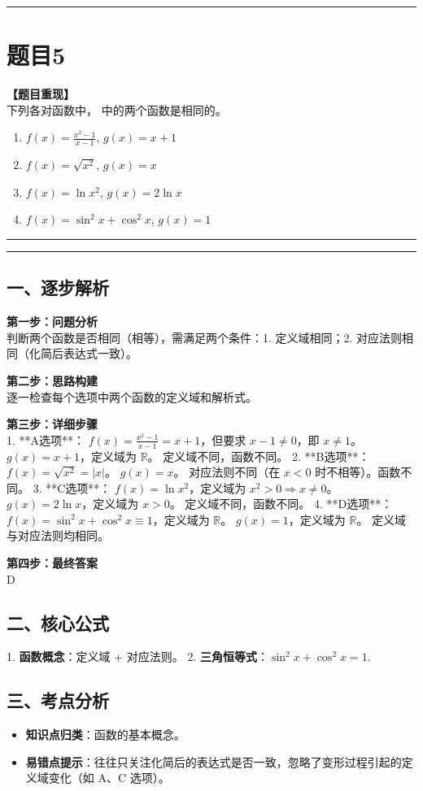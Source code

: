 \documentclass[12pt, a4paper]{ctexart}
\newcommand{\TopSeparator}{
    \par\noindent\rule{\textwidth}{1.5pt}\vspace{0.5em} %
}
\newcommand{\AnalysisSeparator}{
    \par\noindent\rule{\textwidth}{0.5pt}\vspace{0.2em}\hrule\vspace{0.5em} %
}
\newenvironment{RedAnalysis}{
    \par
    \color{red} %
}{
    \par
    \color{black} %
}
\newcommand{\choices}[4]{
    \begin{enumerate}[label=\Alph*., itemsep=0pt, parsep=0pt, topsep=5pt, labelsep=0.5em]
        \item #1
        \item #2
        \item #3
        \item #4
    \end{enumerate}
}
\begin{document}
\vspace{2em}

\TopSeparator
\section*{题目5}

\textbf{【题目重现】} \\
下列各对函数中，\underline{\hspace{1cm}} 中的两个函数是相同的。
\choices
    {$ f(x)=\frac{x^{2}-1}{x-1} $, $ g(x)=x+1 $}
    {$ f(x)=\sqrt{x^{2}} $, $ g(x)=x $}
    {$ f(x) = \ln x^{2} $, $ g(x) = 2\ln x $}
    {$ f(x) = \sin^{2}x + \cos^{2}x $, $ g(x) = 1 $}

\AnalysisSeparator

\begin{RedAnalysis}

\subsection*{一、逐步解析}

\textbf{第一步：问题分析} \\
判断两个函数是否相同（相等），需满足两个条件：1. 定义域相同；2. 对应法则相同（化简后表达式一致）。

\textbf{第二步：思路构建} \\
逐一检查每个选项中两个函数的定义域和解析式。

\textbf{第三步：详细步骤} \\
1. **A选项**：
   $f(x) = \frac{x^2-1}{x-1} = x+1$，但要求 $x-1 \ne 0$，即 $x \ne 1$。
   $g(x) = x+1$，定义域为 $\mathbb{R}$。
   定义域不同，函数不同。
2. **B选项**：
   $f(x) = \sqrt{x^2} = |x|$。
   $g(x) = x$。
   对应法则不同（在 $x < 0$ 时不相等）。函数不同。
3. **C选项**：
   $f(x) = \ln x^2$，定义域为 $x^2 > 0 \Rightarrow x \ne 0$。
   $g(x) = 2\ln x$，定义域为 $x > 0$。
   定义域不同，函数不同。
4. **D选项**：
   $f(x) = \sin^2 x + \cos^2 x \equiv 1$，定义域为 $\mathbb{R}$。
   $g(x) = 1$，定义域为 $\mathbb{R}$。
   定义域与对应法则均相同。

\textbf{第四步：最终答案} \\
D

\subsection*{二、核心公式}
1. \textbf{函数概念}：定义域 + 对应法则。
2. \textbf{三角恒等式}：$\sin^2 x + \cos^2 x = 1$.

\subsection*{三、考点分析}
\begin{itemize}
    \item \textbf{知识点归类}：函数的基本概念。
    \item \textbf{易错点提示}：往往只关注化简后的表达式是否一致，忽略了变形过程引起的定义域变化（如 A、C 选项）。
\end{itemize}

\end{RedAnalysis}
\end{document}
